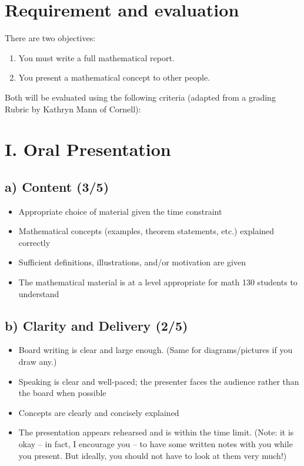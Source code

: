 \documentclass[12pt]{amsart}
\begin{document}
\section{Requirement and evaluation}
There are two objectives:
\begin{enumerate}
	\item You must write a full mathematical report.
	\item You present a mathematical concept to other people.
\end{enumerate}
Both will be evaluated using the following criteria (adapted from a grading Rubric
by Kathryn Mann of Cornell):

\section*{I. Oral Presentation}

\subsection*{a) Content (3/5)}
\begin{itemize}
	\item Appropriate choice of material given the time constraint
	\item Mathematical concepts (examples, theorem statements, etc.) explained correctly
	\item Sufficient definitions, illustrations, and/or motivation are given
	\item The mathematical material is at a level appropriate for math 130 students to understand
\end{itemize}

\subsection*{b) Clarity and Delivery (2/5)}
\begin{itemize}
	\item Board writing is clear and large enough. (Same for diagrams/pictures if you draw any.)
	\item Speaking is clear and well-paced; the presenter faces the audience rather than the board when possible
	\item Concepts are clearly and concisely explained
	\item The presentation appears rehearsed and is within the time limit. (Note: it is okay – in fact, I encourage you – to have some written notes with you while you present. But ideally, you should not have to look at them very much!)
\end{itemize}
\end{document}
